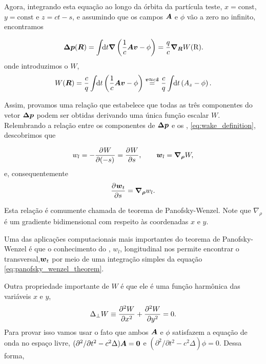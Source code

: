 Agora, integrando esta equação ao longo da órbita da partícula teste, $x=\mathrm{const}$, $y=\mathrm{const}$ e $z = ct-s$, e assumindo que os campos $\vect{A}$ e $\phi$ vão a zero no infinito, encontramos

\begin{equation}
 \vect{\Delta p}(\vect{R}) = \udefint{t}{\vect{\nabla}\left(\frac1c\vect{Av} - \phi \right) = \frac{q}{c} \vect{\nabla_R}W(\mathrm{R})}.
\end{equation}
onde introduzimos o  $W$,
\begin{equation}
 W(\vect{R}) = \frac{c}{q}\udefint{t}{\left(\frac1c \vect{Av} -\phi\right)}
      \overset{\vect{v} \approx c\vect{\hat{z}}}{=}
                 \frac{c}{q}\udefint{t}{\left(A_z -\phi\right)}.
\end{equation}

Assim, provamos uma relação que estabelece que todas as três componentes do vetor $\vect{\Delta p}$ podem ser obtidas derivando uma única função escalar $W$. Relembrando a relação entre os componentes de $\vect{\Delta p}$ e os , \ref{eq:wake_definition}, descobrimos que

\begin{equation}\label{eq:wake_function_definition}
 w_l = - \derpar{W}{(-s)} = \derpar{W}{s},\qquad \vect{w}_l = \vect{\nabla_\rho}W,
\end{equation}
e, consequentemente
\begin{equation}\label{eq:panofsky_wenzel_theorem}
 \derpar{\vect{w}_t}{s} = \vect{\nabla_\rho}w_l.
\end{equation}

Esta relação é comumente chamada de teorema de Panofsky-Wenzel. Note que $\nabla_\rho$ é um gradiente bidimensional com respeito às coordenadas $x$ e $y$.

Uma das aplicações computacionais mais importantes do teorema de Panofsky-Wenzel é que o conhecimento do , $w_l$, longitudinal nos permite encontrar o  transversal,$\vect{w}_t$ por meio de uma integração simples da equação \ref{eq:panofsky_wenzel_theorem}.

Outra propriedade importante de $W$ é que ele é uma função harmônica das variáveis $x$ e $y$,
\begin{equation}\label{eq:wake_potential_harmonic}
 \Delta_\perp W \equiv \derpar[2]{W}{x} + \derpar[2]{W}{y} = 0.
\end{equation}
Para provar isso vamos usar o fato que ambos $\vect{A}$ e $\phi$ satisfazem a equação de onda no espaço livre, $(\partial^2/\partial t^2 - c^2 \Delta)\vect{A} = \vect{0}$ e $(\partial^2/\partial t^2 - c^2 \Delta)\phi = 0$. Dessa forma,

